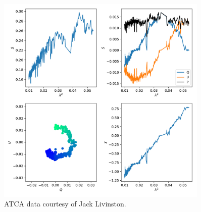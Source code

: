 \documentclass[a4paper]{article}
\begin{document}


        \begin{figure}
            \centering
            \includegraphics[width=0.9\textwidth]{dae/jack-example.pdf}
            \caption{\label{fig:jack-data} ATCA data courtesy of Jack Livinston.}
        \end{figure}
\end{document}
